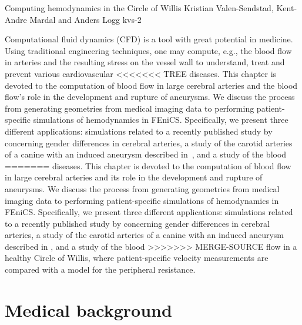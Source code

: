               {Computing hemodynamics in the Circle of Willis}
              {Kristian Valen-Sendstad, Kent-Andre Mardal and Anders Logg}
              {kvs-2}

Computational fluid dynamics (CFD) is a tool with great potential in
medicine. Using traditional engineering techniques, one may compute,
e.g., the blood flow in arteries and the resulting stress on the
vessel wall to understand, treat and prevent various cardiovascular
<<<<<<< TREE
diseases. This chapter is devoted to the computation of blood flow in
large cerebral arteries and the blood flow's role in the development 
and rupture of
aneurysms. We discuss the process from generating geometries from
medical imaging data to performing patient-specific simulations of
hemodynamics in FEniCS.  Specifically, we present three different
applications: simulations related to a recently published study
by~\citet{LindekleivValen-SendstadMorganEtAl2010} concerning gender
differences in cerebral arteries, a study of the carotid arteries of a
canine with an induced aneurysm described
in~\citet{JiangJohnsonValen-SendstadEtAl2010}, and a study of the blood
=======
diseases. This chapter is devoted to the computation of blood
flow in large cerebral arteries and its role in the development
and rupture of aneurysms. We discuss the process from generating
geometries from medical imaging data to performing patient-specific
simulations of hemodynamics in FEniCS.  Specifically, we present
three different applications: simulations related to a recently
published study by \citet{LindekleivValen-SendstadMorganEtAl2010}
concerning gender differences in cerebral arteries, a study of
the carotid arteries of a canine with an induced aneurysm described
in \citet{JiangJohnsonValen-SendstadEtAl2010}, and a study of the blood
>>>>>>> MERGE-SOURCE
flow in a healthy Circle of Willis, where patient-specific velocity
measurements are compared with a model for the peripheral resistance.

\section{Medical background} \label{Medical_Background}

